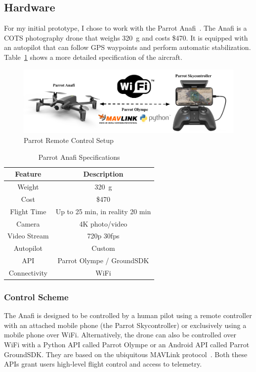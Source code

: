 \subsection{Hardware}
For my initial prototype, I chose to work with the Parrot Anafi~\cite{ParrotAnafi}. The Anafi is a COTS photography drone that weighs 320~g and costs \$470. It is equipped with an autopilot that can follow GPS waypoints and perform automatic stabilization. Table~\ref{tab:anafi-features} shows a more detailed specification of the aircraft.

\begin{figure}
    \centering
    \includegraphics[width=1.0\linewidth]{chapter3/FIGS/ctrl.png}
    \caption{Parrot Remote Control Setup~\cite{ParrotAnafi}}
    \label{fig:parrot-control-setup}
\end{figure}

\begin{table}[]
    \centering
    \begin{tabular}{|c|c|}
     \hline
     \textbf{Feature} & \textbf{Description}  \\
     \hline
     Weight & 320~g \\
     \hline
     Cost & \$470 \\
     \hline
     Flight Time & Up to 25 min, in reality 20 min \\
     \hline
     Camera & 4K photo/video \\
     \hline
     Video Stream & 720p 30fps \\
     \hline
     Autopilot & Custom \\
     \hline
     API & Parrot Olympe / GroundSDK \\
     \hline
     Connectivity & WiFi \\
     \hline
    \end{tabular}
    \caption{Parrot Anafi Specifications}
    \label{tab:anafi-features}
\end{table}

\subsubsection{Control Scheme}
The Anafi is designed to be controlled by a human pilot using a remote controller with an attached mobile phone (the Parrot Skycontroller) or exclusively using a mobile phone over WiFi. Alternatively, the drone can also be controlled over WiFi with a Python API called Parrot Olympe or an Android API called Parrot GroundSDK. They are based on the ubiquitous MAVLink protocol~\cite{MAVLink}. Both these APIs grant users high-level flight control and access to telemetry.

